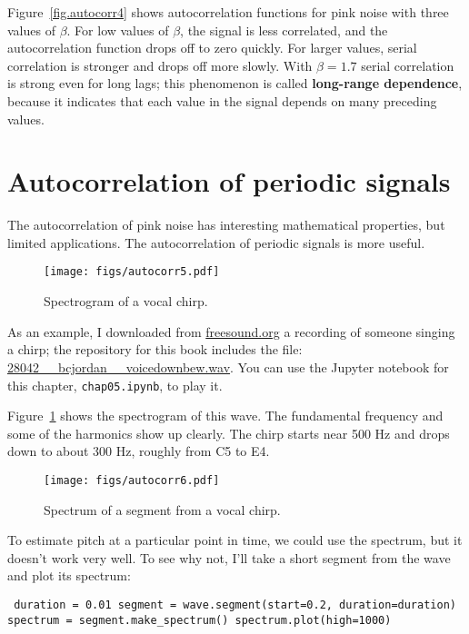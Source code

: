 \documentclass[12pt]{book} \usepackage[width=5.5in,height=8.5in, hmarginratio=3:2,vmarginratio=1:1]{geometry}
\begin{document}
Figure~\ref{fig.autocorr4} shows autocorrelation functions for pink noise with three values of $\beta$. For low values of $\beta$, the signal is less correlated, and the autocorrelation function drops off to zero quickly. For larger values, serial correlation is stronger and drops off more slowly. With $\beta=1.7$ serial correlation is strong even for long lags; this phenomenon is called {\bf long-range dependence}, because it indicates that each value in the signal depends on many preceding values. 

\section{Autocorrelation of periodic signals} 

The autocorrelation of pink noise has interesting mathematical properties, but limited applications. The autocorrelation of periodic signals is more useful. 

\begin{figure} 

\centerline{\texttt{[image: figs/autocorr5.pdf]}} \caption{Spectrogram of a vocal chirp.} \label{fig.autocorr5} \end{figure} 

As an example, I downloaded from \url{freesound.org} a recording of someone singing a chirp; the repository for this book includes the file: \url{28042__bcjordan__voicedownbew.wav}. You can use the Jupyter notebook for this chapter, {\tt chap05.ipynb}, to play it. 

Figure~\ref{fig.autocorr5} shows the spectrogram of this wave. The fundamental frequency and some of the harmonics show up clearly. The chirp starts near 500 Hz and drops down to about 300 Hz, roughly from C5 to E4. 

\begin{figure} 

\centerline{\texttt{[image: figs/autocorr6.pdf]}} \caption{Spectrum of a segment from a vocal chirp.} \label{fig.autocorr6} \end{figure} 

To estimate pitch at a particular point in time, we could use the spectrum, but it doesn't work very well. To see why not, I'll take a short segment from the wave and plot its spectrum: 

\begin{verbatim} duration = 0.01 segment = wave.segment(start=0.2, duration=duration) spectrum = segment.make_spectrum() spectrum.plot(high=1000) \end{verbatim} 
\end{document}
